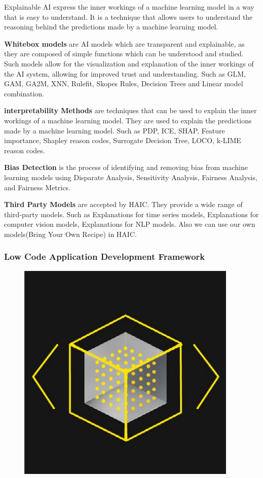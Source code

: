 \documentclass[12pt,a4paper]{report}
\begin{document}
Explainable AI express the inner workings of a machine learning model in a way that is easy 
to understand. It is a technique that allows users to understand the reasoning behind the 
predictions made by a machine learning model.

\textbf{Whitebox models} are AI models which are transparent and explainable, as they are composed of 
simple functions which can be understood and studied. Such models allow for the visualization 
and explanation of the inner workings of the AI system, allowing for improved trust and understanding. Such as 
\ac{GLM}, \ac{GAM}, \ac{GA2M}, \ac{XNN}, Rulefit, Skopes Rules, Decision Trees and Linear 
model combination.

\textbf{interpretability Methods} are techniques that can be used to explain the inner workings of a
machine learning model. They are used to explain the predictions made by a machine learning model. Such as 
\ac{PDP}, \ac{ICE}, \ac{SHAP},
Feature importance, Shapley reason codes, Surrogate Decision Tree, \ac{LOCO}, k-LIME 
reason codes.

\textbf{Bias Detection} is the process of identifying and removing bias from machine learning models using 
Disparate Analysis, Sensitivity Analysis, Fairness Analysis, and Fairness Metrics.

\textbf{Third Party Models} are accepted by \ac{HAIC}. They provide a wide range of third-party models. Such as
Explanations for time series models, Explanations for computer vision models, Explanations for NLP models.
Also we can use our own models(Bring Your Own Recipe) in \ac{HAIC}.

\clearpage
\subsubsection{Low Code Application Development Framework}

\begin{figure}
\includegraphics[width=1\linewidth]{lowCode.png}
\end{figure}
\end{document}
